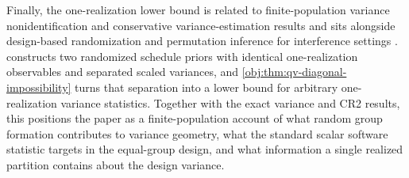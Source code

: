 Finally, the one-realization lower bound is related to finite-population variance nonidentification and conservative variance-estimation results \citep{AronowGreenLee2014,BasseAiroldi2018,HarshawMiddletonSavje2026,ParkWager2026} and sits alongside design-based randomization and permutation inference for interference settings \citep{BasseDingFellerToulis2024,PuelzBasseFellerToulis2022}.  constructs two randomized schedule priors with identical one-realization observables and separated scaled variances, and \cref{obj:thm:qv-diagonal-impossibility} turns that separation into a lower bound for arbitrary one-realization variance statistics. Together with the exact variance and CR2 results, this positions the paper as a finite-population account of what random group formation contributes to variance geometry, what the standard scalar software statistic targets in the equal-group design, and what information a single realized partition contains about the design variance.
